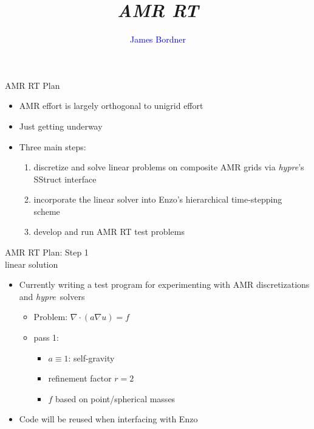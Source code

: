 \documentclass[slideColor,colorBG,nototal,blends,pdf]{prosper}
\title{\textcolor{titlecol}{\textit{AMR RT}}}
\author{\textcolor{blue}{James Bordner}}
\newcommand{\enzo}{\textsf{\normalsize Enzo}}
\newcommand{\hypre}{\textsf{\textit{\normalsize hypre}}}
\newcommand{\code}[1]{\textsf{\small #1}}
\begin{document}
\raggedright


\begin{slide}{\large AMR RT Plan}
\small
\begin{itemize}
\item AMR effort is largely orthogonal to unigrid effort
\item Just getting underway
\item Three main steps:
\begin{enumerate}
\item discretize and solve linear problems on composite AMR grids via \hypre's \code{SStruct} interface
\item incorporate the linear solver into \enzo's hierarchical time-stepping scheme
\item develop and run AMR RT test problems
\end{enumerate}
\end{itemize}
\end{slide}
\begin{slide}{\large AMR RT Plan: Step 1\\
              \normalsize  linear solution}
\small
\begin{itemize}
\item Currently writing a test program for experimenting with AMR discretizations and \hypre\ solvers
\begin{itemize}
\item Problem: $\nabla\cdot(a \nabla u) = f$
 \item pass 1:
\begin{itemize}
\item $a\equiv 1$: self-gravity
\item refinement factor $r=2$
\item $f$ based on point/spherical masses
 \end{itemize}
\end{itemize}
\item Code will be reused when interfacing with \enzo
\end{itemize}
\end{slide}
\end{document}
